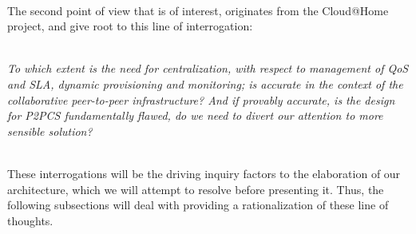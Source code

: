 \documentclass[11pt]{amsart}
\begin{document}
        \\ The second point of view that is of interest, originates from the Cloud@Home
        project, and give root to this line of interrogation:
        
        \\ \emph{To which extent is the need for centralization, with respect to
          management of QoS and SLA, dynamic provisioning and monitoring; is accurate in
          the context of the collaborative peer-to-peer infrastructure? And if provably
          accurate, is the design for P2PCS fundamentally flawed, do we need to divert our
          attention to more sensible solution?}  

        \\ These interrogations will be the driving inquiry factors to the elaboration of
        our architecture, which we will attempt to resolve before presenting it. Thus, the
        following subsections will deal with providing a rationalization of these line of
        thoughts.
\end{document}
